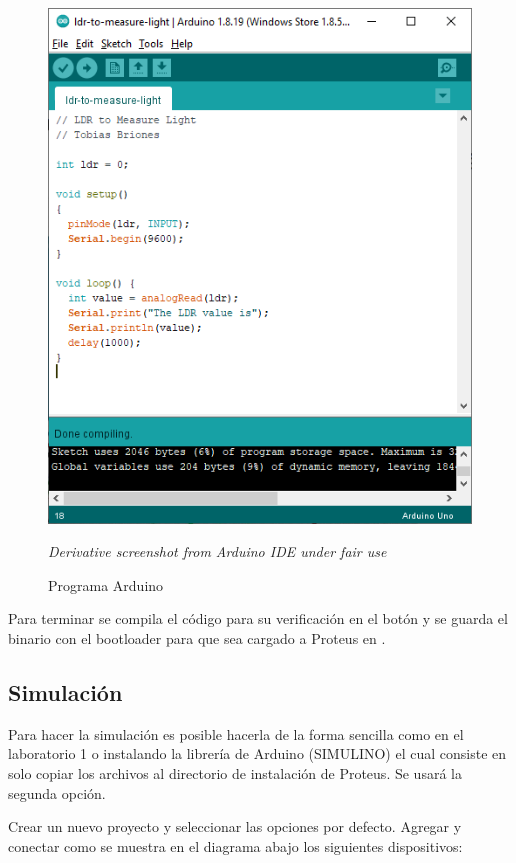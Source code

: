 \documentclass{article}
\begin{document}
\begin{figure}[H]
\centering
\includegraphics[width=0.3\paperwidth]{images/arduino-sketch}
\caption{Programa Arduino}\footnotesize
\textit{Derivative screenshot from Arduino IDE under fair use}
\end{figure}

Para terminar se compila el código para su verificación en el botón
 y se guarda el binario con el bootloader para que sea cargado
a Proteus en .

\subsection{Simulación}

Para hacer la simulación es posible hacerla de la forma sencilla como en el
laboratorio 1 o instalando la librería de Arduino (SIMULINO) el cual consiste
en solo copiar los archivos al directorio de instalación de Proteus. Se usará
la segunda opción.

\bigbreak

Crear un nuevo proyecto y seleccionar las opciones por defecto. Agregar y
conectar como se muestra en el diagrama abajo los siguientes dispositivos:
\end{document}

